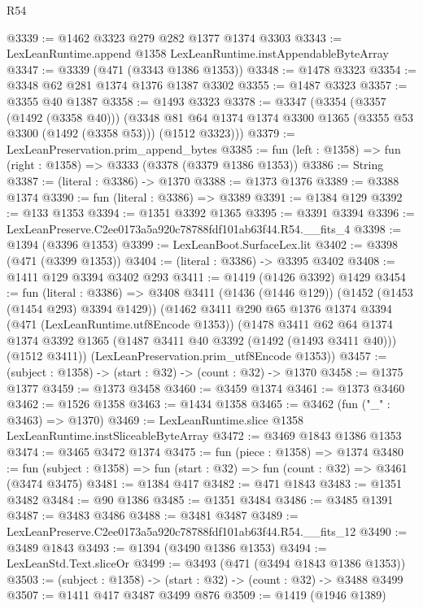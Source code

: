 \begin{lexlean}{R54}
\begin{coremodule}
@3339 := @1462 @3323 @279 @282 @1377 @1374 @3303
@3343 := LexLeanRuntime.append @1358 LexLeanRuntime.instAppendableByteArray
@3347 := @3339 (@471 (@3343 @1386 @1353))
@3348 := @1478 @3323
@3354 := @3348 @62 @281 @1374 @1376 @1387 @3302
@3355 := @1487 @3323
@3357 := @3355 @40 @1387
@3358 := @1493 @3323
@3378 := @3347
    (@3354
      (@3357 (@1492 (@3358 @40)))
      (@3348 @81 @64 @1374 @1374 @3300 @1365 (@3355 @53 @3300 (@1492 (@3358 @53))) (@1512 @3323)))
@3379 := LexLeanPreservation.prim_append_bytes
@3385 := fun (left : @1358) => fun (right : @1358) => @3333 (@3378 (@3379 @1386 @1353))
@3386 := String
@3387 := (literal : @3386) -> @1370
@3388 := @1373 @1376
@3389 := @3388 @1374
@3390 := fun (literal : @3386) => @3389
@3391 := @1384 @129
@3392 := @133 @1353
@3394 := @1351 @3392 @1365
@3395 := @3391 @3394
@3396 := LexLeanPreserve.C2ee0173a5a920c78788fdf101ab63f44.R54.__fits_4
@3398 := @1394 (@3396 @1353)
@3399 := LexLeanBoot.SurfaceLex.lit
@3402 := @3398 (@471 (@3399 @1353))
@3404 := (literal : @3386) -> @3395 @3402
@3408 := @1411 @129 @3394 @3402 @293
@3411 := @1419 (@1426 @3392) @1429
@3454 := fun (literal : @3386) =>
  @3408
    @3411
    (@1436 (@1446 @129))
    (@1452 (@1453 (@1454 @293) @3394 @1429))
    (@1462
      @3411
      @290
      @65
      @1376
      @1374
      @3394
      (@471 (LexLeanRuntime.utf8Encode @1353))
      (@1478
        @3411
        @62
        @64
        @1374
        @1374
        @3392
        @1365
        (@1487 @3411 @40 @3392 (@1492 (@1493 @3411 @40)))
        (@1512 @3411))
      (LexLeanPreservation.prim_utf8Encode @1353))
@3457 := (subject : @1358) -> (start : @32) -> (count : @32) -> @1370
@3458 := @1375 @1377
@3459 := @1373 @3458
@3460 := @3459 @1374
@3461 := @1373 @3460
@3462 := @1526 @1358
@3463 := @1434 @1358
@3465 := @3462 (fun ("_" : @3463) => @1370)
@3469 := LexLeanRuntime.slice @1358 LexLeanRuntime.instSliceableByteArray
@3472 := @3469 @1843 @1386 @1353
@3474 := @3465 @3472 @1374
@3475 := fun (piece : @1358) => @1374
@3480 := fun (subject : @1358) => fun (start : @32) => fun (count : @32) => @3461 (@3474 @3475)
@3481 := @1384 @417
@3482 := @471 @1843
@3483 := @1351 @3482
@3484 := @90 @1386
@3485 := @1351 @3484
@3486 := @3485 @1391
@3487 := @3483 @3486
@3488 := @3481 @3487
@3489 := LexLeanPreserve.C2ee0173a5a920c78788fdf101ab63f44.R54.__fits_12
@3490 := @3489 @1843
@3493 := @1394 (@3490 @1386 @1353)
@3494 := LexLeanStd.Text.sliceOr
@3499 := @3493 (@471 (@3494 @1843 @1386 @1353))
@3503 := (subject : @1358) -> (start : @32) -> (count : @32) -> @3488 @3499
@3507 := @1411 @417 @3487 @3499 @876
@3509 := @1419 (@1946 @1389)

\end{coremodule}
\end{lexlean}
